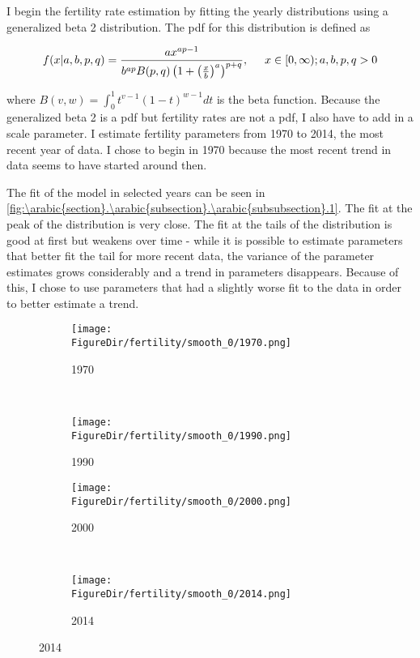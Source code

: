 \documentclass[10pt]{article}
\renewcommand{\thesection}{\arabic{section}}
\renewcommand{\thesubsection}{\thesection.\arabic{subsection}}
\renewcommand{\thesubsubsection}{\thesubsection.\arabic{subsubsection}}
\renewcommand{\subsubsection}[2][]{\oldsubsubsection[#1]{#2}\index{#1}\label{sec:\thesubsubsection}}
\numberwithin{equation}{subsection}
\newcommand*{\FigureDir}{../../graphs}
\begin{document}
\subsubsection{Fertility Rates}

\par I begin the fertility rate estimation by fitting the yearly distributions using a generalized beta 2 distribution. The pdf for this distribution is defined as

\begin{equation}\label{eq:gb2_pdf}
   f(x|a, b, p, q) = \frac{ax^{ap-1}}{b^{ap}B(p,q)\left(1 + \left(\frac{x}{b}\right)^a\right)^{p+q}}, \hspace{5mm} x \in [0,\infty); a, b, p, q > 0   
\end{equation}

\par where \(B(v,w) = \int_0^1 t^{v-1}(1-t)^{w-1}dt\) is the beta function. Because the generalized beta 2 is a pdf but fertility rates are not a pdf, I also have to add in a scale parameter. I estimate fertility parameters from 1970 to 2014, the most recent year of data. I chose to begin in 1970 because the most recent trend in data seems to have started around then.

\par The fit of the model in selected years can be seen in \autoref{fig:\thesubsubsection.1}. The fit at the peak of the distribution is very close. The fit at the tails of the distribution is good at first but weakens over time - while it is possible to estimate parameters that better fit the tail for more recent data, the variance of the parameter estimates grows considerably and a trend in parameters disappears. Because of this, I chose to use parameters that had a slightly worse fit to the data in order to better estimate a trend.

\begin{figure}[!ht]
	\centering
   \caption{\label{fig:\thesubsubsection.1}Fertility Estimated by Generalized Beta 2}
		\begin{subfigure}{0.5\textwidth}
			\centering
			\texttt{[image: \\FigureDir/fertility/smooth\_0/1970.png]}
			\caption{1970}
		\end{subfigure}%
		~ %
		\begin{subfigure}{0.5\textwidth}
			\centering
			\texttt{[image: \\FigureDir/fertility/smooth\_0/1990.png]}
			\caption{1990}
		\end{subfigure}%
		\newline
		\begin{subfigure}{0.5\textwidth}
			\centering
			\texttt{[image: \\FigureDir/fertility/smooth\_0/2000.png]}
			\caption{2000}
		\end{subfigure}%
		~ %
		\begin{subfigure}{0.5\textwidth}
			\centering
			\texttt{[image: \\FigureDir/fertility/smooth\_0/2014.png]}
			\caption{2014}
		\end{subfigure}%
\end{figure}
\end{document}
